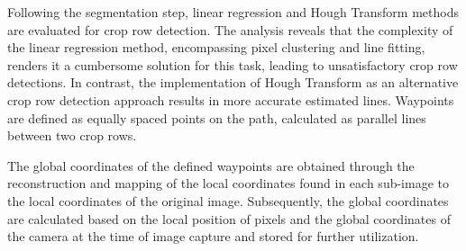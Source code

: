 \documentclass[conference]{IEEEtran}
\begin{document}
Following the segmentation step, linear regression and Hough Transform methods are evaluated for crop row detection. The analysis reveals that the complexity of the linear regression method, encompassing pixel clustering and line fitting, renders it a cumbersome solution for this task, leading to unsatisfactory crop row detections. In contrast, the implementation of Hough Transform as an alternative crop row detection approach results in more accurate estimated lines. Waypoints are defined as equally spaced points on the path, calculated as parallel lines between two crop rows.

The global coordinates of the defined waypoints are obtained through the reconstruction and mapping of the local coordinates found in each sub-image to the local coordinates of the original image. Subsequently, the global coordinates are calculated based on the local position of pixels and the global coordinates of the camera at the time of image capture and stored for further utilization.
\end{document}
